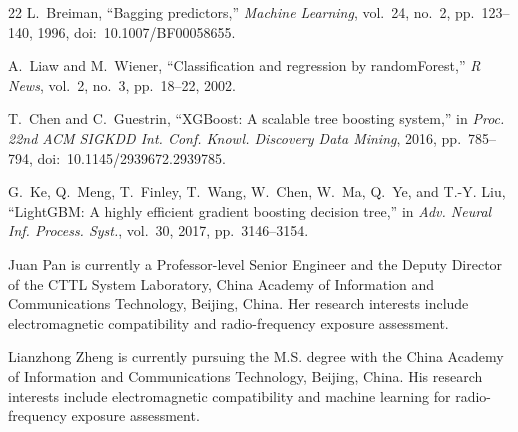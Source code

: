 \documentclass{ieeeaccess}
\begin{document}
\begin{thebibliography}{22}
L.~Breiman, ``Bagging predictors,'' \emph{Machine Learning}, vol.~24,
no.~2, pp.~123--140, 1996, doi:~10.1007/BF00058655.

A.~Liaw and M.~Wiener, ``Classification and regression by randomForest,''
\emph{R News}, vol.~2, no.~3, pp.~18--22, 2002.

T.~Chen and C.~Guestrin, ``XGBoost: A scalable tree boosting system,''
in \emph{Proc. 22nd ACM SIGKDD Int. Conf. Knowl. Discovery Data Mining},
2016, pp.~785--794, doi:~10.1145/2939672.2939785.

G.~Ke, Q.~Meng, T.~Finley, T.~Wang, W.~Chen, W.~Ma, Q.~Ye, and T.-Y. Liu,
``LightGBM: A highly efficient gradient boosting decision tree,''
in \emph{Adv. Neural Inf. Process. Syst.}, vol.~30, 2017, pp.~3146--3154.

\end{thebibliography}

\begin{IEEEbiographynophoto}{Juan Pan}
is currently a Professor-level Senior Engineer and
the Deputy Director of the CTTL System Laboratory, China Academy of Information
and Communications Technology, Beijing, China. Her research interests include
electromagnetic compatibility and radio-frequency exposure assessment.
\end{IEEEbiographynophoto}

\begin{IEEEbiographynophoto}{Lianzhong Zheng}
is currently pursuing the M.S. degree with
the China Academy of Information and Communications Technology, Beijing, China.
His research interests include electromagnetic compatibility and machine learning
for radio-frequency exposure assessment.
\end{IEEEbiographynophoto}

\EOD
\end{document}
